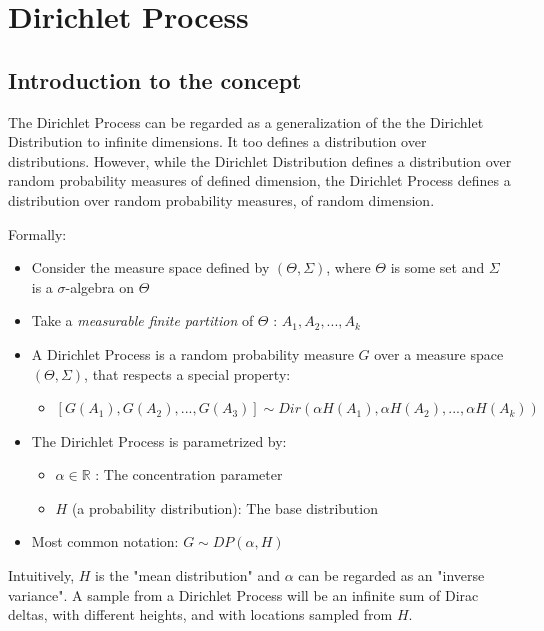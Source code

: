 \documentclass[11pt]{article}
\begin{document}
\section{Dirichlet Process}\label{dirichlet-process}
	
\subsection{Introduction to the concept}\label{introduction-to-the-concept}
	
The Dirichlet Process can be regarded as a generalization of the the
Dirichlet Distribution to infinite dimensions. It too defines a
distribution over distributions. However, while the Dirichlet
Distribution defines a distribution over random probability measures of
defined dimension, the Dirichlet Process defines a distribution over
random probability measures, of random dimension.
	
Formally:
	
\begin{itemize}
	\item Consider the measure space defined by \((\Theta, \Sigma)\), where
	\(\Theta\) is some set and \(\Sigma\) is a \(\sigma\)-algebra on
	\(\Theta\)
	\item Take a \emph{measurable finite partition} of \(\Theta\) :
	\(A_1, A_2, ..., A_k\)
	\item A Dirichlet Process is a random probability measure \(G\) over a
	measure space \((\Theta, \Sigma)\), that respects a special property:
		
	\begin{itemize}
		\item \([G(A_1), G(A_2), ..., G(A_3)] \sim Dir(\alpha H(A_1), \alpha H(A_2), ..., \alpha H(A_k))\)
	\end{itemize}
	\item The Dirichlet Process is parametrized by:
		
		\begin{itemize}
			\item \(\alpha \in \mathbb{R}\) : The concentration parameter
			\item \(H\) (a probability distribution): The base distribution
		\end{itemize}
		\item
		Most common notation: \(G \sim DP(\alpha, H)\)
\end{itemize}
	
Intuitively, \(H\) is the "mean distribution" and \(\alpha\) can be
regarded as an "inverse variance". A sample from a Dirichlet Process
will be an infinite sum of Dirac deltas, with different heights, and
with locations sampled from \(H\).
	
\end{document}
